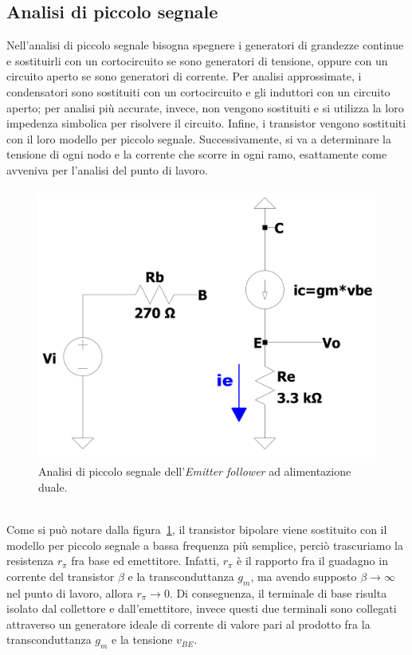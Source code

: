 \documentclass{report}
\begin{document}
\subsection{Analisi di piccolo segnale} \label{piccolosegnaleEFv1}
Nell'analisi di piccolo segnale bisogna spegnere i generatori di grandezze continue e sostituirli con un cortocircuito se sono generatori di tensione, oppure con un circuito aperto se sono generatori di corrente. Per analisi approssimate, i condensatori sono sostituiti con un cortocircuito e gli induttori con un circuito aperto; per analisi più accurate, invece, non vengono sostituiti e si utilizza la loro impedenza simbolica per risolvere il circuito. Infine, i transistor vengono sostituiti con il loro modello per piccolo segnale. Successivamente, si va a determinare la tensione di ogni nodo e la corrente che scorre in ogni ramo, esattamente come avveniva per l'analisi del punto di lavoro. 
\begin{figure}[h]
\centering
\includegraphics[height=9cm]{immagini/EFv1_ps}
\caption{Analisi di piccolo segnale dell'\textit{Emitter follower} ad alimentazione duale.}
\label{figura:EFv1_ps}
\end{figure}
\\Come si può notare dalla figura~\ref{figura:EFv1_ps}, il transistor bipolare viene sostituito con il modello per piccolo segnale a bassa frequenza più semplice, perciò trascuriamo la resistenza $r_\pi$ fra base ed emettitore. Infatti, $r_\pi$ è il rapporto fra il guadagno in corrente del transistor $\beta$ e la transconduttanza $g_m$, ma avendo supposto $\displaystyle{\beta\rightarrow\infty}$ nel punto di lavoro, allora $\displaystyle{r_\pi\rightarrow 0}$. Di conseguenza, il terminale di base risulta isolato dal collettore e dall'emettitore, invece questi due terminali sono collegati attraverso un generatore ideale di corrente di valore pari al prodotto fra la transconduttanza $g_m$ e la tensione $v_{BE}$.
\end{document}
